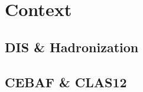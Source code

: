 \section{Context}
\begin{frame}{}
    \centering \Huge{}
\end{frame}

\subsection{DIS \& Hadronization}


\subsection{CEBAF \& CLAS12}


